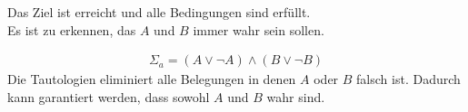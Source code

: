 Das Ziel ist erreicht und alle Bedingungen sind erfüllt.\\

Es ist zu erkennen, das $A$ und $B$ immer wahr sein sollen.

\begin{eqnarray}
\Sigma_{a} = \left( A \lor \lnot A \right) \land   \left( B \lor \lnot B \right)
\end{eqnarray}
Die Tautologien eliminiert alle Belegungen in denen $A$ oder $B$ falsch ist. Dadurch kann garantiert werden, dass sowohl $A$ und $B$ wahr sind. 
